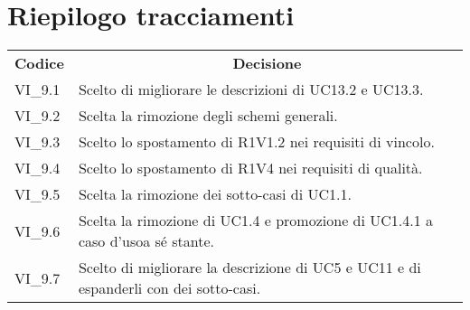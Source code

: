 
\section{Riepilogo tracciamenti}
\begin{longtable} {
		>{\centering}p{17mm} 
		>{}p{120mm}}
	\rowcolor{gray!50}
	\textbf{Codice} & \multicolumn{1}{c}{\textbf{Decisione}} \\%
	VI\_9.1 & Scelto di migliorare le descrizioni di UC13.2 e UC13.3. \TBstrut \\ [2mm]
	VI\_9.2 & Scelta la rimozione degli schemi generali. \TBstrut \\ [2mm]
	VI\_9.3 & Scelto lo spostamento di R1V1.2 nei requisiti di vincolo. \TBstrut \\ [2mm]
	VI\_9.4 & Scelto lo spostamento di R1V4 nei requisiti di qualità. \TBstrut \\ [2mm]
	VI\_9.5 & Scelta la rimozione dei sotto-casi di UC1.1. \TBstrut \\ [2mm]
	VI\_9.6 & Scelta la rimozione  di UC1.4 e promozione di UC1.4.1 a caso d'uso\glosp a sé stante. \TBstrut \\ [2mm]
	VI\_9.7 & Scelto di migliorare la descrizione di UC5 e UC11 e di espanderli con dei sotto-casi. \TBstrut \\ [2mm]
	
\end{longtable}